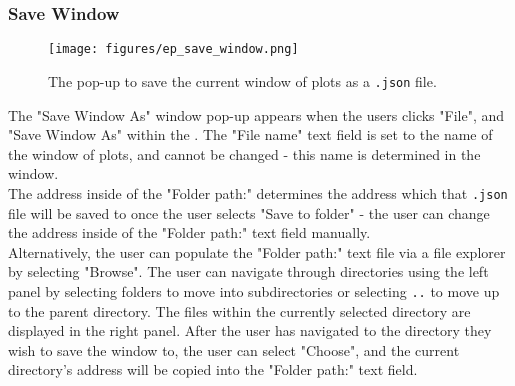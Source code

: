 \documentclass{article}
\begin{document}
\newpage

\subsubsection{Save Window}
\label{sec:Save_window}
\begin{figure} [h]
    \centering
    \texttt{[image: figures/ep\_save\_window.png]}
    \caption{\label{fig:ep_save_window} The pop-up to save the current window of plots as a \texttt{.json} file.}
\end{figure}

The "Save Window As" window pop-up appears when the users clicks "File", and "Save Window As" within the \textbf{}. The "File name" text field is set to the name of the window of plots, and cannot be changed - this name is determined in the \textbf{} window. \\
The address inside of the "Folder path:" determines the address which that \texttt{.json} file will be saved to once the user selects "Save to folder" -
the user can change the address inside of the "Folder path:" text field manually. \\
Alternatively, the user can populate the "Folder path:" text file via a file explorer by selecting "Browse". The user can navigate through directories using the left panel by selecting folders to move into subdirectories or
selecting \texttt{..} to move up to the parent directory. The files within the currently selected directory are
displayed in the right panel. After the user has navigated to the directory they wish to save the window to, the user can select "Choose", and the current directory's address will be copied into the "Folder path:" text field.

\newpage
\end{document}
